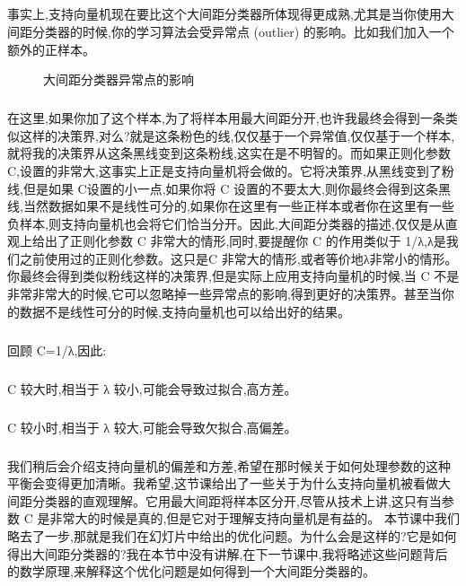 \documentclass{article}
\begin{document}
\begin{CJK}{UTF8}{gbsn}
\begin{figure}[H]
\label{fig:716}
\end{figure}
\subparagraph{}
事实上,支持向量机现在要比这个大间距分类器所体现得更成熟,尤其是当你使用大间距分类器的时候,你的学习算法会受异常点 (outlier) 的影响。比如我们加入一个额外的正样本。
\begin{figure}[H]
\label{fig:715}
\caption{大间距分类器异常点的影响}
\end{figure}
\subparagraph{}
在这里,如果你加了这个样本,为了将样本用最大间距分开,也许我最终会得到一条类似这样的决策界,对么?就是这条粉色的线,仅仅基于一个异常值,仅仅基于一个样本,就将我的决策界从这条黑线变到这条粉线,这实在是不明智的。而如果正则化参数 C,设置的非常大,这事实上正是支持向量机将会做的。它将决策界,从黑线变到了粉线,但是如果 C设置的小一点,如果你将 C 设置的不要太大,则你最终会得到这条黑线,当然数据如果不是线性可分的,如果你在这里有一些正样本或者你在这里有一些负样本,则支持向量机也会将它们恰当分开。因此,大间距分类器的描述,仅仅是从直观上给出了正则化参数 C 非常大的情形,同时,要提醒你 C 的作用类似于 1/λ,λ是我们之前使用过的正则化参数。这只是C 非常大的情形,或者等价地λ非常小的情形。你最终会得到类似粉线这样的决策界,但是实际上应用支持向量机的时候,当 C 不是非常非常大的时候,它可以忽略掉一些异常点的影响,得到更好的决策界。甚至当你的数据不是线性可分的时候,支持向量机也可以给出好的结果。
\subparagraph{}
回顾 C=1/λ,因此:
\subparagraph{}
C 较大时,相当于 λ 较小,可能会导致过拟合,高方差。
\subparagraph{}
C 较小时,相当于 λ 较大,可能会导致欠拟合,高偏差。
\subparagraph{}
我们稍后会介绍支持向量机的偏差和方差,希望在那时候关于如何处理参数的这种平衡会变得更加清晰。我希望,这节课给出了一些关于为什么支持向量机被看做大间距分类器的直观理解。它用最大间距将样本区分开,尽管从技术上讲,这只有当参数 C 是非常大的时候是真的,但是它对于理解支持向量机是有益的。
本节课中我们略去了一步,那就是我们在幻灯片中给出的优化问题。为什么会是这样的?它是如何得出大间距分类器的?我在本节中没有讲解,在下一节课中,我将略述这些问题背后的数学原理,来解释这个优化问题是如何得到一个大间距分类器的。

\end{CJK}
\end{document}
